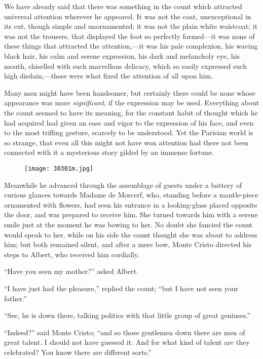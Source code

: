 We have already said that there was something in the count which
attracted universal attention wherever he appeared. It was not the
coat, unexceptional in its cut, though simple and unornamented; it was
not the plain white waistcoat; it was not the trousers, that displayed
the foot so perfectly formed—it was none of these things that attracted
the attention,—it was his pale complexion, his waving black hair, his
calm and serene expression, his dark and melancholy eye, his mouth,
chiselled with such marvellous delicacy, which so easily expressed such
high disdain,—these were what fixed the attention of all upon him.

Many men might have been handsomer, but certainly there could be none
whose appearance was more \textit{significant}, if the expression may be used.
Everything about the count seemed to have its meaning, for the constant
habit of thought which he had acquired had given an ease and vigor to
the expression of his face, and even to the most trifling gesture,
scarcely to be understood. Yet the Parisian world is so strange, that
even all this might not have won attention had there not been connected
with it a mysterious story gilded by an immense fortune.

\begin{figure}[ht]
\texttt{[image: 30301m.jpg]}
\end{figure}

Meanwhile he advanced through the assemblage of guests under a battery
of curious glances towards Madame de Morcerf, who, standing before a
mantle-piece ornamented with flowers, had seen his entrance in a
looking-glass placed opposite the door, and was prepared to receive
him. She turned towards him with a serene smile just at the moment he
was bowing to her. No doubt she fancied the count would speak to her,
while on his side the count thought she was about to address him; but
both remained silent, and after a mere bow, Monte Cristo directed his
steps to Albert, who received him cordially.

“Have you seen my mother?” asked Albert.

“I have just had the pleasure,” replied the count; “but I have not seen
your father.”

“See, he is down there, talking politics with that little group of
great geniuses.”

“Indeed?” said Monte Cristo; “and so those gentlemen down there are men
of great talent. I should not have guessed it. And for what kind of
talent are they celebrated? You know there are different sorts.”

